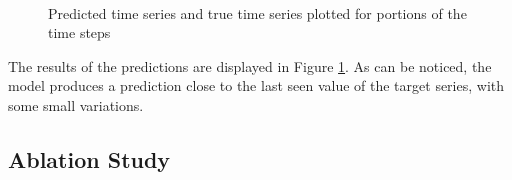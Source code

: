\documentclass{article}
\begin{document}
\begin{figure}
  \centering
   \\
  \caption{Predicted time series and true time series plotted for portions of
the time steps}
  \label{fig:res}
\end{figure}

The results of the predictions are displayed in Figure \ref{fig:res}. As can be
noticed,
the model produces a prediction close to the last seen value of the target
series, with
some small variations.

\subsection{Ablation Study}
\end{document}
